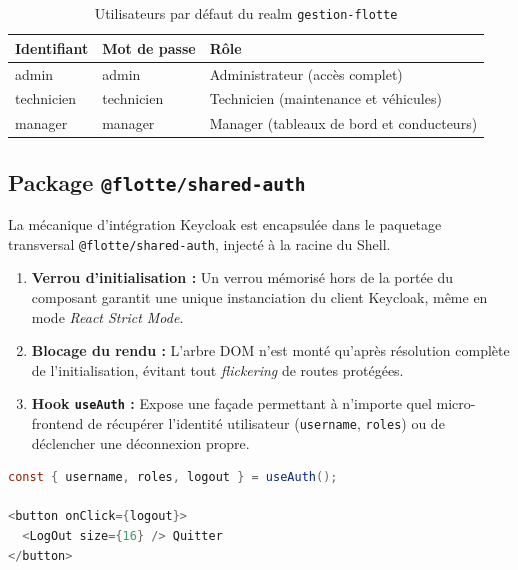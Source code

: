 \documentclass[12pt,a4paper]{article}
\begin{document}
\begin{table}[H]
\centering
\renewcommand{\arraystretch}{1.4}
\begin{tabular}{
  >{\ttfamily\raggedright\arraybackslash}p{3cm}
  >{\ttfamily\centering\arraybackslash}p{3cm}
  >{\raggedright\arraybackslash}p{7cm}
}
\toprule
\rowcolor{secondary}
\textbf{Identifiant} & \textbf{Mot de passe} & \textbf{R\^{o}le} \\
\midrule
admin      & admin      & Administrateur (acc\`{e}s complet) \\
\rowcolor{rowgray}
technicien & technicien & Technicien (maintenance et v\'{e}hicules) \\
manager    & manager    & Manager (tableaux de bord et conducteurs) \\
\bottomrule
\end{tabular}
\caption{Utilisateurs par d\'{e}faut du realm \texttt{gestion-flotte}}
\end{table}

\subsection{Package \texttt{@flotte/shared-auth}}

La m\'{e}canique d'int\'{e}gration Keycloak est encapsul\'{e}e dans le paquetage transversal \texttt{@flotte/shared-auth}, inject\'{e} \`{a} la racine du Shell.

\begin{enumerate}[leftmargin=*]
  \item \textbf{Verrou d'initialisation :} Un verrou m\'{e}moris\'{e} hors de la port\'{e}e du composant garantit une unique instanciation du client Keycloak, m\^{e}me en mode \textit{React Strict Mode}.
  \item \textbf{Blocage du rendu :} L'arbre DOM n'est mont\'{e} qu'apr\`{e}s r\'{e}solution compl\`{e}te de l'initialisation, \'{e}vitant tout \textit{flickering} de routes prot\'{e}g\'{e}es.
  \item \textbf{Hook \texttt{useAuth} :} Expose une fa\c{c}ade permettant \`{a} n'importe quel micro-frontend de r\'{e}cup\'{e}rer l'identit\'{e} utilisateur (\texttt{username}, \texttt{roles}) ou de d\'{e}clencher une d\'{e}connexion propre.
\end{enumerate}

\begin{lstlisting}[language=Java, caption=Utilisation du hook useAuth dans le Layout]
const { username, roles, logout } = useAuth();

<button onClick={logout}>
  <LogOut size={16} /> Quitter
</button>
\end{lstlisting}
\end{document}
